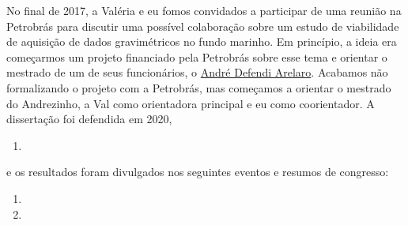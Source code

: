 \bigskip

\noindent No final de 2017, a Valéria e eu fomos convidados a participar de uma reunião
na Petrobrás para discutir uma possível colaboração sobre um estudo de viabilidade de
aquisição de dados gravimétricos no fundo marinho. Em princípio, a ideia era começarmos 
um projeto financiado pela Petrobrás sobre esse tema e orientar o mestrado de um de seus
funcionários, o \href{https://lattes.cnpq.br/9144077841390825}{André Defendi Arelaro}.
Acabamos não formalizando o projeto com a Petrobrás, mas começamos a orientar o
mestrado do Andrezinho, a Val como orientadora principal e eu como coorientador.
A dissertação foi defendida em 2020,
\begin{enumerate}
	\item{}
\end{enumerate}
e os resultados foram divulgados nos seguintes eventos e resumos de congresso:
\begin{enumerate}
	\item {}
	\item {}
\end{enumerate}
